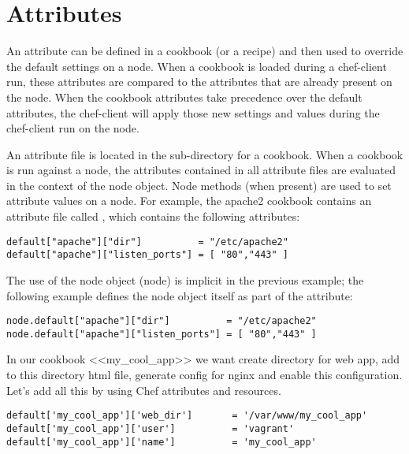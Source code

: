 \section{Attributes}

An attribute can be defined in a cookbook (or a recipe) and then used to override the default settings on a node. When a cookbook is loaded during a chef-client run, these attributes are compared to the attributes that are already present on the node. When the cookbook attributes take precedence over the default attributes, the chef-client will apply those new settings and values during the chef-client run on the node.

An attribute file is located in the  sub-directory for a cookbook. When a cookbook is run against a node, the attributes contained in all attribute files are evaluated in the context of the node object. Node methods (when present) are used to set attribute values on a node. For example, the apache2 cookbook contains an attribute file called , which contains the following attributes:

\begin{lstlisting}[label=lst:cookbook-attributes1]
default["apache"]["dir"]          = "/etc/apache2"
default["apache"]["listen_ports"] = [ "80","443" ]
\end{lstlisting}

The use of the node object (node) is implicit in the previous example; the following example defines the node object itself as part of the attribute:

\begin{lstlisting}[label=lst:cookbook-attributes2]
node.default["apache"]["dir"]          = "/etc/apache2"
node.default["apache"]["listen_ports"] = [ "80","443" ]
\end{lstlisting}

In our cookbook <<my\_cool\_app>> we want create directory for web app, add to this directory html file, generate config for nginx and enable this configuration. Let's add all this by using Chef attributes and resources.

\begin{lstlisting}[label=lst:cookbook-attributes3,title=my-server-cloud/site-cookbooks/my\_cool\_app/attributes/default.rb]
default['my_cool_app']['web_dir']       = '/var/www/my_cool_app'
default['my_cool_app']['user']          = 'vagrant'
default['my_cool_app']['name']          = 'my_cool_app'
\end{lstlisting}

